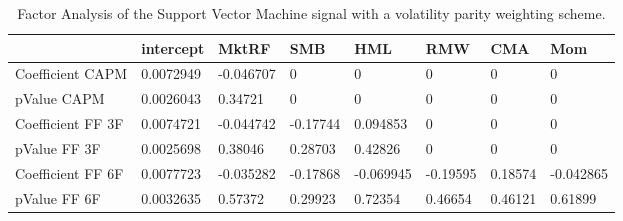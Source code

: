 \begin{table}[H]
\centering
\begin{tabular}{llllllll}
& intercept & MktRF & SMB & HML & RMW & CMA & Mom \\ 
\hline 
Coefficient CAPM & 0.0072949 & -0.046707 & 0 & 0 & 0 & 0 & 0 \\ 
pValue CAPM & 0.0026043 & 0.34721 & 0 & 0 & 0 & 0 & 0 \\ 
Coefficient FF 3F & 0.0074721 & -0.044742 & -0.17744 & 0.094853 & 0 & 0 & 0 \\ 
pValue FF 3F & 0.0025698 & 0.38046 & 0.28703 & 0.42826 & 0 & 0 & 0 \\ 
Coefficient FF 6F & 0.0077723 & -0.035282 & -0.17868 & -0.069945 & -0.19595 & 0.18574 & -0.042865 \\ 
pValue FF 6F & 0.0032635 & 0.57372 & 0.29923 & 0.72354 & 0.46654 & 0.46121 & 0.61899 \\ 
\hline
\end{tabular}
\caption{Factor Analysis of the Support Vector Machine signal with a volatility parity weighting scheme.}
\label{SVM_MODEL_FACTOR}
\end{table}